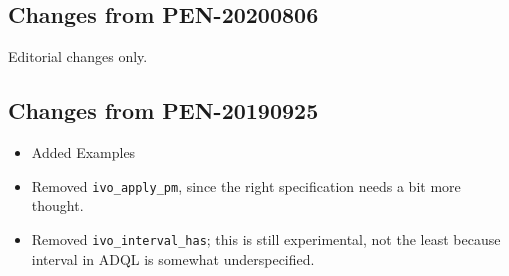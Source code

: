 \documentclass[11pt,a4paper]{ivoa}
\begin{document}
\subsection{Changes from PEN-20200806}

Editorial changes only.

\subsection{Changes from PEN-20190925}

\begin{itemize}
\item Added Examples
\item Removed \verb|ivo_apply_pm|, since the right specification needs a
bit more thought.
\item Removed \verb|ivo_interval_has|; this is still experimental, not
the least because interval in ADQL is somewhat underspecified.
\end{itemize}


\end{document}
